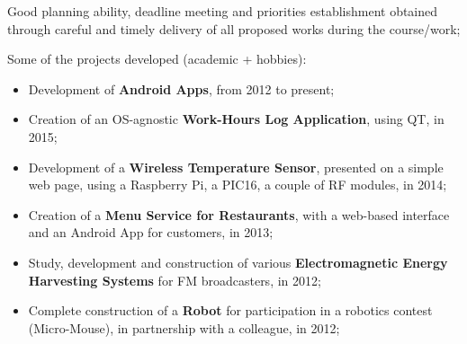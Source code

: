 \documentclass[helvetica,openbib,totpages]{europecv}
\begin{document}
\begin{europecv}

\ecvlanguageheader{(*)}
\ecvlanguagefooter[10pt]{(*)}




{Good planning ability, deadline meeting and priorities establishment obtained through careful and timely delivery of all proposed works during the course/work;}

{Some of the projects developed (academic + hobbies):
\begin{itemize}
	\item Development of \textbf{Android Apps}, from 2012 to present;
	\item Creation of an OS-agnostic \textbf{Work-Hours Log Application}, using QT, in 2015;
	\item Development of a \textbf{Wireless Temperature Sensor}, presented on a simple web page, using a Raspberry Pi, a PIC16, a couple of RF modules, in 2014;
	\item Creation of a \textbf{Menu Service for Restaurants}, with a web-based interface and an Android App for customers, in 2013;
	\item Study, development and construction of various \textbf{Electromagnetic Energy Harvesting Systems} for FM broadcasters, in 2012;
	\item Complete construction of a \textbf{Robot} for participation in a robotics contest (Micro-Mouse), in partnership with a colleague, in 2012;
\end{itemize}}


\end{europecv}
\end{document}
